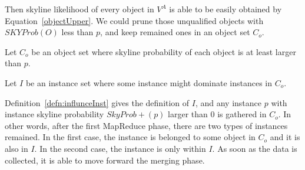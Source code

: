 Then skyline likelihood of every object in $V^A$ is able to be easily obtained by Equation~\ref{objectUpper}. We could prune those unqualified objects with $SKYProb(O)$ less than $p$, and keep remained ones in an object set $C_o$.

\begin{defn}
\label{defn:canObj}
Let $C_o$ be an object set where skyline probability of each object is at least larger than $p$.
\end{defn}

\begin{defn}
\label{defn:influnceInst}
Let $I$ be an instance set where some instance might dominate instances in $C_o$.
\end{defn}

Definition~\ref{defn:influnceInst} gives the definition of $I$, and any instance $p$ with instance skyline probability $SkyProb+(p)$ larger than $0$ is gathered in $C_o$. In other words, after the first MapReduce phase, there are two types of instances remained. In the first case, the instance is belonged to some object in $C_o$ and it is also in $I$. In the second case, the instance is only within $I$. As soon as the data is collected, it is able to move forward the merging phase.

